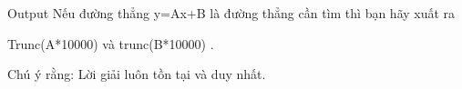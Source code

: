 Output
Nếu đường thẳng y=Ax+B là đường thẳng cần tìm thì bạn hãy xuất ra  

   Trunc(A*10000) và trunc(B*10000) .  

       Chú ý rằng: Lời giải luôn tồn tại và duy nhất.